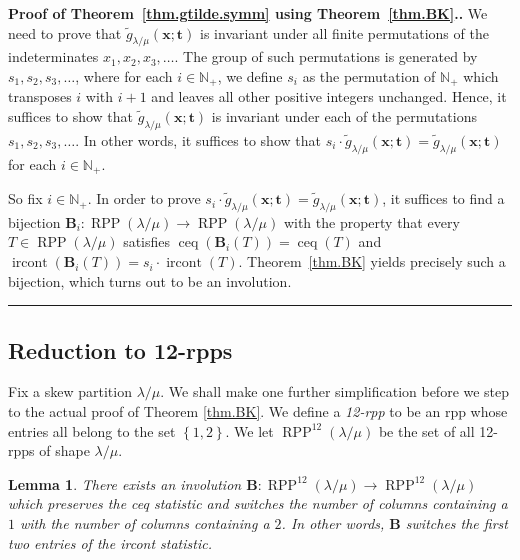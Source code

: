 \documentclass[12pt]{article}
\theoremstyle{plain}
\newtheorem{lemma}[theorem]{Lemma}
\theoremstyle{definition}
\newenvironment{proof}[1][Proof]{\noindent\textbf{#1.} }{\ \rule{0.5em}{0.5em}}
\newcommand{\Nplus}{\mathbb{N}_{+}}
\def\ceq{{\operatorname{ceq}}}
\def\ircont{{\operatorname{ircont}}}
\def\t{{\mathbf{t}}}
\def\x{{\mathbf{x}}}
\def\lm{{\lambda/\mu}}
\def\OneTwoRPP{{\operatorname{RPP}^{12}\left(  \lambda/\mu\right)}}
\begin{document}
\begin{proof}[Proof of Theorem~\ref{thm.gtilde.symm} using
Theorem~\ref{thm.BK}.]
We need to prove that $\widetilde{g}_{\lambda/\mu}(\x;\t)$ is invariant
under all finite permutations of the indeterminates
$x_1, x_2, x_3, \ldots$. The group of such permutations is generated by
$s_1, s_2, s_3, \ldots$, where for each $i \in \Nplus$, we define $s_i$
as the permutation of $\Nplus$ which transposes $i$ with $i+1$ and
leaves all other positive integers unchanged. Hence, it suffices to
show that $\widetilde{g}_{\lambda/\mu}(\x;\t)$ is invariant under each
of the permutations $s_1, s_2, s_3, \ldots$. In other words, it suffices
to show that $s_i \cdot \widetilde{g}_{\lambda/\mu}(\x;\t)
= \widetilde{g}_{\lambda/\mu}(\x;\t)$ for each $i \in \Nplus$.

So fix $i \in \Nplus$. In order to prove
$s_i \cdot \widetilde{g}_{\lambda/\mu}(\x;\t)
= \widetilde{g}_{\lambda/\mu}(\x;\t)$, it suffices to find a bijection
$\mathbf{B}_{i}:\operatorname{RPP}\left(  \lambda/\mu\right)
\rightarrow\operatorname{RPP}\left(  \lambda/\mu\right)  $ with the
property that every $T \in \operatorname{RPP}\left(  \lambda/\mu\right)$
satisfies $\ceq\left(\mathbf{B}_i\left(T\right)\right) = \ceq \left(T\right)$ and
$\ircont\left(\mathbf{B}_i\left(T\right)\right) = s_i \cdot \ircont \left(T\right)$.
Theorem~\ref{thm.BK} yields precisely such a bijection, which turns out to be an involution.
\end{proof}

\subsection{Reduction to 12-rpps}

Fix a skew partition $\lm$. We shall make one further simplification before we step to the actual proof of
Theorem \ref{thm.BK}. We define a \textit{12-rpp} to be an rpp whose entries all belong to the set $\left\{  1,2\right\}  $. We let $\OneTwoRPP$ be the set of all 12-rpps of shape $\lm$.

\begin{lemma}
\label{lem.BK} There exists an
involution $\mathbf{B}:\OneTwoRPP\rightarrow\OneTwoRPP$
which preserves the ceq statistic and switches the number of columns containing a $1$ with the number of columns containing a $2$. In other words, $\mathbf{B}$ switches the first two entries of the ircont statistic.
\end{lemma}
\end{document}
